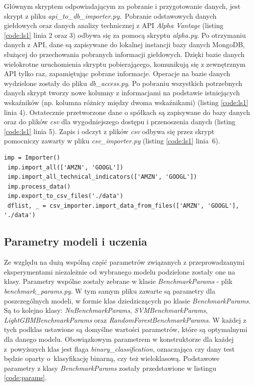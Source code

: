 \documentclass[a4paper, twoside, 11pt, openright]{article}
\begin{document}
Głównym skryptem odpowiadającym za pobranie i przygotowanie danych, jest skrypt z pliku \textit{api\_to\_db\_importer.py}.~Pobranie odstawowych danych giełdowych oraz danych analizy technicznej z API \textit{Alpha Vantage} \cite{alphavantage} (listing \ref{code:ls1} linia 2 oraz 3) odbywa się za pomocą skryptu \textit{alpha.py}. Po otrzymaniu danych z API, dane są zapisywane do lokalnej instancji bazy danych MongoDB, służącej do przechowania pobranych informacji giełdowych. Dzięki bazie danych wielokrotne uruchomienia skryptu pobierającego, komunikują się z zewnętrznym API tylko raz, zapamiętując pobrane informacje. Operacje na bazie danych wydzielone zostały do pliku \textit{db\_access.py}. Po pobraniu wszystkich potrzebnych danych skrypt tworzy nowe kolumny z informacjami na podstawie istniejących wskaźników (np. kolumna różnicy między dwoma wskaźnikami) (listing \ref{code:ls1} linia 4). Ostatecznie przetworzone dane o spółkach są zapisywane do bazy danych oraz do plików \textit{csv} dla wygodniejszego dostępu i przenoszenia danych (listing \ref{code:ls1} linia 5). Zapis i odczyt z plików \textit{csv} odbywa się przez skrypt pomocniczy zawarty w pliku \textit{csv\_importer.py} (listing \ref{code:ls1} linia~6).

\begin{lstlisting}[caption={Pobranie i wstępne przetworzenie danych (plik \textit{api\_to\_db\_importer.py}).}, label={code:ls1},frame=single, captionpos=b, mathescape=true]
 imp = Importer()
 imp.import_all(['AMZN', 'GOOGL'])
 imp.import_all_technical_indicators(['AMZN', 'GOOGL'])
 imp.process_data()
 imp.export_to_csv_files('./data')
 dflist, _ = csv_importer.import_data_from_files(['AMZN', 'GOOGL'], './data')
\end{lstlisting}

\subsection*{Parametry modeli i uczenia}

Ze względu na dużą wspólną część parametrów związanych z przeprowadzanymi eksperymentami niezależnie od wybranego modelu podzielone zostały one na klasy. Parametry wspólne zostały zebrane w klasie \textit{BenchmarkParams} - plik \textit{benchmark\_params.py}. W tym samym pliku zawarte są parametry dla poszczególnych modeli, w formie klas dziedziczących po klasie \textit{BenchmarkParams}. Są to kolejno klasy: \textit{NnBenchmarkParams}, \textit{SVMBenchmarkParams}, \textit{LightGBMBenchmarkParams} oraz \textit{RandomForestBenchmarkParams}. W każdej z tych podklas ustawione są domyślne wartości parametrów, które są optymalnymi dla danego modelu. Obowiązkowym parametrem w konstruktorze dla każdej z~powyższych klas jest flaga \textit{binary\_classification}, oznaczająca czy dany test będzie oparty o~klasyfikację binarną, czy też wieloklasową. Podstawowe parametry z klasy \textit{BenchmarkParams} zostały przedstawione w listingu \ref{code:params}.
\end{document}
